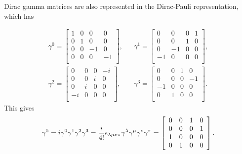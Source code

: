 Dirac gamma matrices are also represented in the Dirac-Pauli
representation, which has

\begin{eqnarray}
\gamma^0=\left[\begin{array}{rrrr}
          1 & 0 & 0 & 0 \\
          0 & 1 & 0 & 0 \\
          0 & 0 & -1 & 0 \\
          0 & 0 & 0 & -1 \\
          \end{array}\right],& &
\gamma^1=\left[\begin{array}{rrrr}
          0 & 0 & 0 & 1 \\
          0 & 0 & 1 & 0 \\
          0 & -1 & 0 & 0 \\
         -1 & 0 & 0 & 0 \\
          \end{array}\right],\\
\gamma^2=\left[\begin{array}{rrrr}
          0 & 0 & 0 & -i \\
          0 & 0 & i & 0 \\
          0 & i & 0 & 0 \\
         -i & 0 & 0 & 0 \\
          \end{array}\right],& &
\gamma^3=\left[\begin{array}{rrrr}
          0 & 0 & 1 & 0 \\
          0 & 0 & 0 & -1 \\
          -1 & 0 & 0 & 0 \\
          0 & 1 & 0 & 0 \\
          \end{array}\right].
\end{eqnarray}
This gives
\begin{equation}
\gamma^5=i\gamma^0\gamma^1\gamma^2\gamma^3
	={i\over4!}\epsilon_{\lambda\mu\nu\pi}
\gamma^{\lambda}\gamma^{\mu}\gamma^{\nu}\gamma^{\pi}
=\left[\begin{array}{rrrr}
          0 & 0 & 1 & 0 \\	
          0 & 0 & 0 & 1 \\	
          1 & 0 & 0 & 0 \\
          0 & 1 & 0 & 0 \\
          \end{array}\right].
\end{equation}



